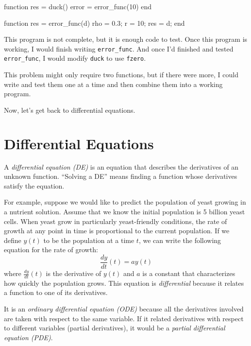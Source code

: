 \documentclass[../../book.tex]{subfiles}
\begin{document}
\begin{code}
function res = duck()
    error = error_func(10)
end

function res = error_func(d)
    rho = 0.3;      %
    r = 10;         %
    res = d;
end
\end{code}

This program is not complete, but it is enough code to test.
Once this program is working, I would finish writing \lstinline{error_func}.
And once I'd finished and tested \lstinline{error_func}, I would modify
\lstinline{duck} to use \lstinline{fzero}.

This problem might only require two functions, but if there
were more, I could write and test them one at a time and then
combine them into a working program.

Now, let's get back to differential equations.


\section{Differential Equations}
\label{diffeq}

A \emph{differential equation (DE)} is an equation that describes the
derivatives of an unknown function.  ``Solving a DE'' means finding a
function whose derivatives satisfy the equation.


For example, suppose we would like to predict the population of yeast growing in a nutrient solution.  Assume that we know the initial population is 5 billion yeast cells.
When yeast grow in particularly yeast-friendly
conditions, the rate of growth at any point in time is proportional to the current population.  If we define $y(t)$ to be the population at a time $t$, we can write the following equation for the rate of growth:
%
\begin{equation*}
\frac{dy}{dt}(t) = a y(t)
\end{equation*}
%
where $\frac{dy}{dt}(t)$ is the derivative of $y(t)$ and
$a$ is a constant that characterizes how quickly the population
grows.
This equation is \emph{differential} because it relates a function to one of its derivatives.


It is an \emph{ordinary differential equation (ODE)} because all the
derivatives involved are taken with respect to the
same variable.
If it related derivatives with respect to
different variables (partial derivatives), it would be a \emph{partial
differential equation (PDE)}.
\end{document}
